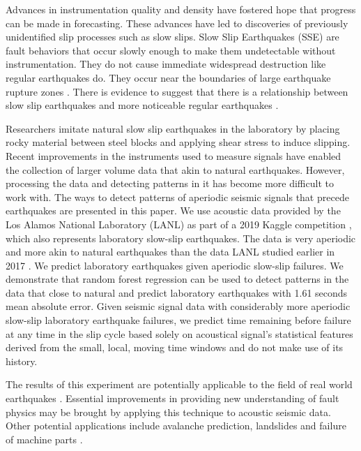 \documentclass[]{llncs} %
\begin{document}
Advances in instrumentation quality and density have fostered hope that progress can be made in forecasting. These advances have led to discoveries of previously unidentified slip processes such as slow slips. Slow Slip Earthquakes (SSE) are fault behaviors that occur slowly enough to make them undetectable without instrumentation. They do not cause immediate widespread destruction like regular earthquakes do. They occur near the boundaries of large earthquake rupture zones \cite{Slip}. There is evidence to suggest that there is a relationship between slow slip earthquakes and more noticeable regular earthquakes \cite{SlowSlip}. \par

Researchers imitate natural slow slip earthquakes in the laboratory by placing rocky material between steel blocks and applying shear stress to induce slipping. Recent improvements in the instruments \cite{kaggle} used to measure signals have enabled the collection of larger volume data that akin to natural earthquakes. However, processing the data and detecting patterns in it has become more difficult to work with. The ways to detect patterns of aperiodic seismic signals that precede earthquakes are presented in this paper. We use acoustic data provided by the Los Alamos National Laboratory (LANL) as part of a 2019 Kaggle competition \cite{kaggle}, which also represents laboratory slow-slip earthquakes. The data is very aperiodic and more akin to natural earthquakes than the data LANL studied earlier in 2017 \cite{kaggle}. We predict laboratory earthquakes given aperiodic slow-slip failures. We demonstrate that random forest regression can be used to detect patterns in the data that close to natural and predict laboratory earthquakes with 1.61 seconds mean absolute error. Given seismic signal data with considerably more aperiodic slow-slip laboratory earthquake failures, we predict time remaining before failure at any time in the slip cycle based solely on acoustical signal's statistical features derived from the small, local, moving time windows and do not make use of its history.\par

The results of this experiment are potentially applicable to the field of real world earthquakes \cite{Bertrand}. Essential improvements in providing new understanding of fault physics may be brought by applying this technique to acoustic seismic data. Other potential applications include avalanche prediction, landslides and failure of machine parts \cite{Bertrand}. \par
\end{document}
